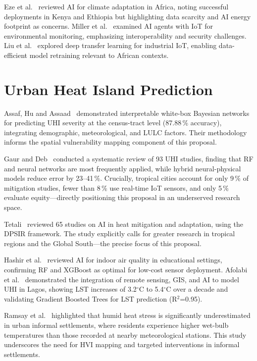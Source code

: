 \documentclass[12pt,a4paper]{report}
\begin{document}
Eze et al.~\cite{eze2025} reviewed AI for climate adaptation in Africa, noting successful deployments in Kenya and Ethiopia but highlighting data scarcity and AI energy footprint as concerns. Miller et al.~\cite{miller2025} examined AI agents with IoT for environmental monitoring, emphasizing interoperability and security challenges. Liu et al.~\cite{liu2021} explored deep transfer learning for industrial IoT, enabling data-efficient model retraining relevant to African contexts.

\section{Urban Heat Island Prediction}
Assaf, Hu and Assaad~\cite{assaf2023} demonstrated interpretable white-box Bayesian networks for predicting UHI severity at the census-tract level (87.88\,\% accuracy), integrating demographic, meteorological, and LULC factors. Their methodology informs the spatial vulnerability mapping component of this proposal.

Gaur and Deb~\cite{gaur2026} conducted a systematic review of 93 UHI studies, finding that RF and neural networks are most frequently applied, while hybrid neural-physical models reduce error by 23--41\,\%. Crucially, tropical cities account for only 9\,\% of mitigation studies, fewer than 8\,\% use real-time IoT sensors, and only 5\,\% evaluate equity—directly positioning this proposal in an underserved research space.

Tetali~\cite{tetali2025} reviewed 65 studies on AI in heat mitigation and adaptation, using the DPSIR framework. The study explicitly calls for greater research in tropical regions and the Global South—the precise focus of this proposal.

Hashir et al.~\cite{hashir2026} reviewed AI for indoor air quality in educational settings, confirming RF and XGBoost as optimal for low-cost sensor deployment. Afolabi et al.~\cite{OS_Afolabi_2025,Olalekan_Afolabi_2025} demonstrated the integration of remote sensing, GIS, and AI to model UHI in Lagos, showing LST increases of 3.2$^\circ$C to 5.4$^\circ$C over a decade and validating Gradient Boosted Trees for LST prediction (R$^2$=0.95).

Ramsay et al.~\cite{ramsay2024} highlighted that humid heat stress is significantly underestimated in urban informal settlements, where residents experience higher wet-bulb temperatures than those recorded at nearby meteorological stations. This study underscores the need for HVI mapping and targeted interventions in informal settlements.
\end{document}
